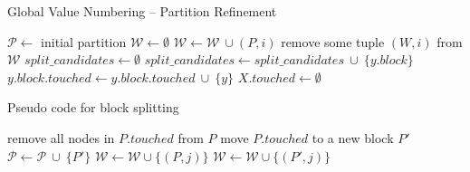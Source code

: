 \begin{algorithm}[h]
\caption{Global Value Numbering -- Partition Refinement}
\label{alg:gvn-ir}
\begin{algorithmic}[1]
\State $\mathcal{P} \leftarrow$ initial partition
\State $\mathcal{W} \leftarrow \emptyset$
\label{alg:gvn-ir:init-worklist-loop}
    \State $\mathcal{W} \leftarrow \mathcal{W}~\cup (P, i)$
  \EndFor
\EndFor
{}
  \State remove some tuple $(W,i)$ from $\mathcal{W}$
  \State $\mathit{split\_ candidates} \leftarrow \emptyset$
    \label{alg:gvn-ir:touched-nodes-loop}
      \State $\mathit{split\_ candidates} \leftarrow \mathit{split\_ candidates}~ \cup ~ \lbrace y.\mathit{block}\rbrace$ %
      \State $y.\mathit{block}.\mathit{touched} \leftarrow y.\mathit{block}.\mathit{touched}~ \cup ~ \lbrace y\rbrace$
    \EndFor
  \EndFor
    \label{alg:gvn-ir:if-test-split-touched}
      \State {}
    \EndIf
    \State $X.\mathit{touched} \leftarrow \emptyset$
  \EndFor
\EndWhile
\end{algorithmic}
\end{algorithm}

\begin{algorithm}[h]
\caption{Pseudo code for block splitting}
\label{alg:gvn-ir-split}
\begin{algorithmic}[1]
  \State remove all nodes in $P.\mathit{touched}$ from $P$\label{alg:gvn-ir:remove-touched-nodes-from-block}
  \State move $P.\mathit{touched}$ to a new block $P'$\label{alg:gvn-ir:move-touched-nodes-to-new-block}
  \State $\mathcal{P} \leftarrow \mathcal{P}~\cup ~\lbrace P'\rbrace$\label{alg:gvn-ir:add-new-block-to-partition}
  \label{alg:gvn-ir:split-loop}
      \State $\mathcal{W} \leftarrow \mathcal{W} \cup \lbrace (P,j)\rbrace$
    \Else
      \State $\mathcal{W} \leftarrow \mathcal{W} \cup \lbrace (P',j)\rbrace$
    \EndIf
  \EndFor
\EndProcedure
\end{algorithmic}
\end{algorithm}

